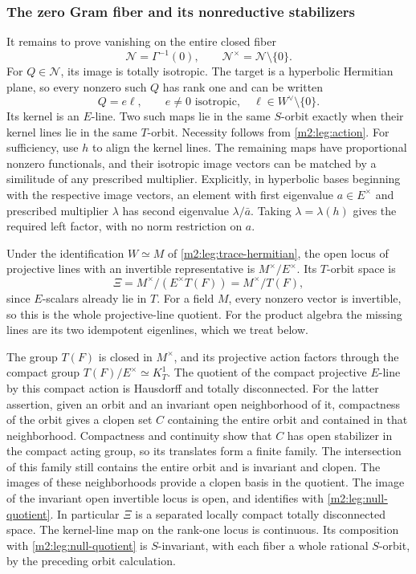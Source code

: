 \subsubsection{The zero Gram fiber and its nonreductive stabilizers}

It remains to prove vanishing on the entire closed fiber
\[
 \mathcal N=\Gamma^{-1}(0),\qquad
 \mathcal N^\times=\mathcal N\setminus\{0\}.
\]
For $Q\in\mathcal N$, its image is totally isotropic. The target is
a hyperbolic Hermitian plane, so every nonzero such $Q$ has rank one
and can be written
\begin{equation}\label{m2:leg:null-factorization}
 Q=e\ell,\qquad e\ne0\text{ isotropic},\quad
 \ell\in W^\vee\setminus\{0\}.
\end{equation}
Its kernel is an $E$-line. Two such maps lie in the same $S$-orbit
exactly when their kernel lines lie in the same $T$-orbit.
Necessity follows from \eqref{m2:leg:action}. For sufficiency, use $h$
to align the kernel lines. The remaining maps have proportional
nonzero functionals, and their isotropic image vectors can be
matched by a similitude of any prescribed multiplier.
Explicitly, in hyperbolic bases beginning with the respective
image vectors, an element with first eigenvalue $a\in E^\times$
and prescribed multiplier $\lambda$ has second eigenvalue
$\lambda/\bar a$. Taking $\lambda=\lambda(h)$ gives the required
left factor, with no norm restriction on $a$.

Under the identification $W\simeq M$ of
\eqref{m2:leg:trace-hermitian}, the open locus of projective lines
with an invertible representative is
$M^\times/E^\times$. Its $T$-orbit space is
\begin{equation}\label{m2:leg:null-quotient}
 \Xi=M^\times/(E^\times T(F))=M^\times/T(F),
\end{equation}
since $E$-scalars already lie in $T$.
For a field $M$, every nonzero vector is invertible, so this is the
whole projective-line quotient. For the product algebra the missing
lines are its two idempotent eigenlines, which we treat below.

The group $T(F)$ is closed in $M^\times$, and its projective action
factors through the compact group $T(F)/E^\times\simeq K_T^1$.
The quotient of the compact projective $E$-line by this compact action
is Hausdorff and totally disconnected. For the latter assertion,
given an orbit and an invariant open neighborhood of it, compactness
of the orbit gives a clopen set $C$ containing the entire orbit and
contained in that neighborhood. Compactness and continuity show
that $C$ has open stabilizer in the compact acting group, so its
translates form a finite family. The intersection of this family
still contains the entire orbit and is invariant and clopen.
The images of these neighborhoods provide
a clopen basis in the quotient. The image of the invariant
open invertible locus is open, and identifies with \eqref{m2:leg:null-quotient}.
In particular $\Xi$ is a separated locally compact totally
disconnected space. The kernel-line map on the rank-one locus is
continuous. Its composition with \eqref{m2:leg:null-quotient} is
$S$-invariant, with each fiber a whole rational $S$-orbit, by the
preceding orbit calculation.

